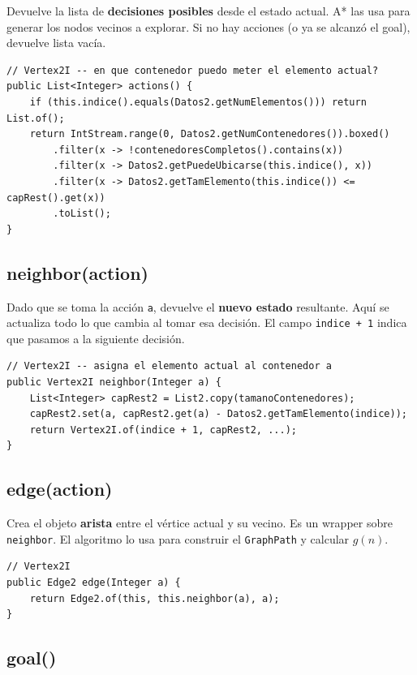 \documentclass[12pt, a4paper]{article}
\begin{document}
Devuelve la lista de \textbf{decisiones posibles} desde el estado actual. A* las usa para generar los nodos vecinos a explorar. Si no hay acciones (o ya se alcanzó el goal), devuelve lista vacía.

\begin{lstlisting}[style=java]
// Vertex2I -- en que contenedor puedo meter el elemento actual?
public List<Integer> actions() {
    if (this.indice().equals(Datos2.getNumElementos())) return List.of();
    return IntStream.range(0, Datos2.getNumContenedores()).boxed()
        .filter(x -> !contenedoresCompletos().contains(x))
        .filter(x -> Datos2.getPuedeUbicarse(this.indice(), x))
        .filter(x -> Datos2.getTamElemento(this.indice()) <= capRest().get(x))
        .toList();
}
\end{lstlisting}

\subsection{neighbor(action)}

Dado que se toma la acción \texttt{a}, devuelve el \textbf{nuevo estado} resultante. Aquí se actualiza todo lo que cambia al tomar esa decisión. El campo \texttt{indice + 1} indica que pasamos a la siguiente decisión.

\begin{lstlisting}[style=java]
// Vertex2I -- asigna el elemento actual al contenedor a
public Vertex2I neighbor(Integer a) {
    List<Integer> capRest2 = List2.copy(tamanoContenedores);
    capRest2.set(a, capRest2.get(a) - Datos2.getTamElemento(indice));
    return Vertex2I.of(indice + 1, capRest2, ...);
}
\end{lstlisting}

\subsection{edge(action)}

Crea el objeto \textbf{arista} entre el vértice actual y su vecino. Es un wrapper sobre \texttt{neighbor}. El algoritmo lo usa para construir el \texttt{GraphPath} y calcular $g(n)$.

\begin{lstlisting}[style=java]
// Vertex2I
public Edge2 edge(Integer a) {
    return Edge2.of(this, this.neighbor(a), a);
}
\end{lstlisting}

\subsection{goal()}
\end{document}
